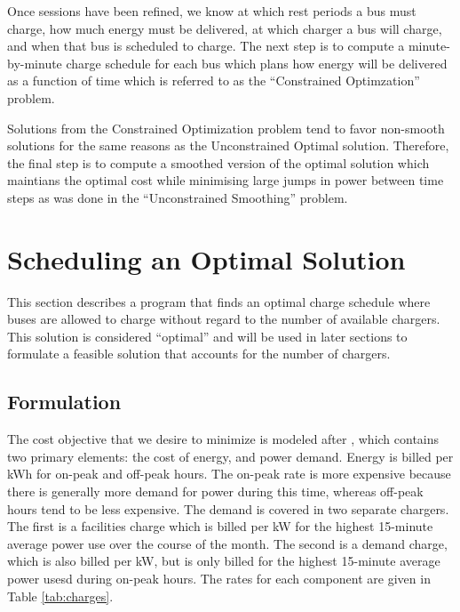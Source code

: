 \par Once sessions have been refined, we know at which rest periods a bus must charge, how much energy must be delivered, at which charger a bus will charge, and when that bus is scheduled to charge. The next step is to compute a minute-by-minute charge schedule for each bus which plans how energy will be delivered as a function of time which is referred to as the ``Constrained Optimzation'' problem. 
\par Solutions from the Constrained Optimization problem tend to favor non-smooth solutions for the same reasons as the Unconstrained Optimal solution. Therefore, the final step is to compute a smoothed version of the optimal solution which maintians the optimal cost while minimising large jumps in power between time steps as was done in the ``Unconstrained Smoothing'' problem.


\section{Scheduling an Optimal Solution\label{sec:optimalSolution}}
This section describes a program that finds an optimal charge schedule where buses are allowed to charge without regard to the number of available chargers. This solution is considered ``optimal'' and will be used in later sections to formulate a feasible solution that accounts for the number of chargers.
 

 
\subsection{Formulation\label{sec:formulation}} 
The cost objective that we desire to minimize is modeled after \cite{rocky_mountain_power_rocky_2021}, which contains two primary elements: the cost of energy, and power demand. Energy is billed per kWh for on-peak and off-peak hours. The on-peak rate is more expensive because there is generally more demand for power during this time, whereas off-peak hours tend to be less expensive. The demand is covered in two separate chargers.  The first is a facilities charge which is billed per kW for the highest 15-minute average power use over the course of the month. The second is a demand charge, which is also billed per kW, but is only billed for the highest 15-minute average power usesd during on-peak hours. The rates for each component are given in Table \ref{tab:charges}.  

